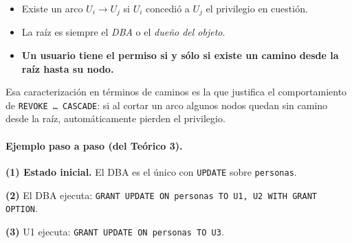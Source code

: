 \documentclass[11pt,a4paper]{article}
\begin{document}
\begin{itemize}
    \item Existe un arco $U_i \to U_j$ si $U_i$ concedió a $U_j$
    el privilegio en cuestión.
    \item La raíz es siempre el \emph{DBA} o el \emph{dueño del objeto}.
    \item \textbf{Un usuario tiene el permiso si y sólo si existe un
    camino desde la raíz hasta su nodo.}
\end{itemize}

Esa caracterización en términos de caminos es la que justifica el
comportamiento de \texttt{REVOKE \dots\ CASCADE}: si al cortar un arco
algunos nodos quedan sin camino desde la raíz, automáticamente pierden
el privilegio.

\paragraph{Ejemplo paso a paso (del Teórico 3).}

\textbf{(1) Estado inicial.} El DBA es el único con \texttt{UPDATE}
sobre \texttt{personas}.

\begin{center}
\end{center}

\textbf{(2)} El DBA ejecuta:
\texttt{GRANT UPDATE ON personas TO U1, U2 WITH GRANT OPTION}.

\begin{center}
\end{center}

\textbf{(3)} U1 ejecuta:
\texttt{GRANT UPDATE ON personas TO U3}.
\end{document}

